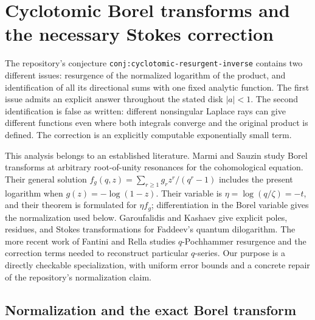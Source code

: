 
\section{Cyclotomic Borel transforms and the necessary Stokes correction}
\label{sec:cyclotomic-borel-correction}

The repository's conjecture \texttt{conj:cyclotomic-resurgent-inverse} \cite{repo-qfrontier}
contains two different issues: resurgence of the normalized logarithm of
the product, and identification of all its directional sums with one fixed
analytic function.  The first issue admits an explicit answer throughout
the stated disk $|a|<1$.  The second identification is false as written:
different nonsingular Laplace rays can give different functions even where
both integrals converge and the original product is defined.  The
correction is an explicitly computable exponentially small term.

This analysis belongs to an established literature.  Marmi and Sauzin
\cite[\S4.2--4.3, especially Theorem~4.3]{marmi-sauzin} study Borel
transforms at arbitrary root-of-unity resonances for the cohomological
equation.  Their general solution
$f_g(q,z)=\sum_{r\geq1}g_r z^r/(q^r-1)$ includes the present logarithm
when $g(z)=-\log(1-z)$.  Their variable is $\eta=\log(q/\zeta)=-t$,
and their theorem is formulated for $\eta f_g$; differentiation in the
Borel variable gives the normalization used below.  Garoufalidis and
Kashaev \cite{garoufalidis-kashaev} give explicit poles, residues, and
Stokes transformations for Faddeev's quantum dilogarithm.  The more recent
work of Fantini and Rella \cite[\S3]{fantini-rella} studies
$q$-Pochhammer resurgence and the correction terms needed to reconstruct
particular $q$-series.  Our purpose is a directly checkable specialization,
with uniform error bounds and a concrete repair of the repository's
normalization claim.

\subsection{Normalization and the exact Borel transform}

